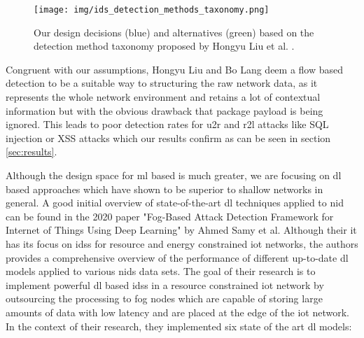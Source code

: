 \begin{figure}[H]
	\centering
	\texttt{[image: img/ids\_detection\_methods\_taxonomy.png]}
	\caption{Our design decisions (blue) and alternatives (green) based on the detection method taxonomy proposed by Hongyu Liu et al. \cite{nid_ml_survey_2019}.}
	\label{fig:stateofart:ids_detection_methods_taxonomy}
\end{figure}

Congruent with our assumptions, Hongyu Liu and Bo Lang deem a flow based detection to be a suitable way to structuring the raw network data, as it represents the whole network environment and retains a lot of contextual information but with the obvious drawback that package payload is being ignored. This leads to poor detection rates for \gls{u2r} and \gls{r2l} attacks like SQL injection or XSS attacks which our results confirm as can be seen in section \ref{sec:results}. \par

Although the design space for \gls{ml} based is much greater, we are focusing on \gls{dl} based approaches which have shown to be superior to shallow networks in general. A good initial overview of state-of-the-art \gls{dl} techniques applied to \gls{nid} can be found in the 2020 paper "Fog-Based Attack Detection Framework for Internet of Things Using Deep Learning" \cite{fog_based_detection_survey_2020} by Ahmed Samy et al. Although their it has its focus on \glspl{ids} for resource and energy constrained \gls{iot} networks, the authors provides a comprehensive overview of the performance of different up-to-date \gls{dl} models applied to various \gls{nids} data sets. The goal of their research is to implement powerful \gls{dl} based \glspl{ids} in a resource constrained \gls{iot} network by outsourcing the processing to fog nodes which are capable of storing large amounts of data with low latency and are placed at the edge of the \gls{iot} network. In the context of their research, they implemented six state of the art \gls{dl} models:


